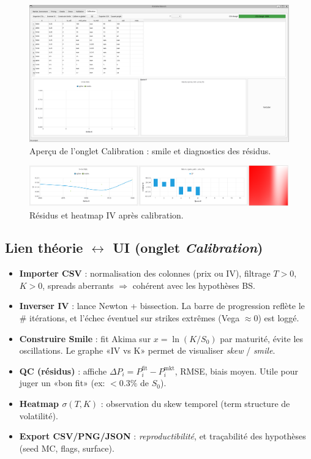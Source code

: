 \documentclass[11pt,a4paper]{article}
\begin{document}
\begin{figure}[h!]
  \centering
    \includegraphics[width=0.9\linewidth]{img/apercu_onglet_calibration.png}
  \caption{Aperçu de l’onglet Calibration : smile et diagnostics des résidus.}
\end{figure}

\begin{figure}[h!]
  \centering
    \includegraphics[width=0.9\linewidth]{img/heatmap_et_residus.png}
  \caption{Résidus et heatmap IV après calibration.}
\end{figure}

\subsection*{Lien théorie $\leftrightarrow$ UI (onglet \emph{Calibration})}
\begin{itemize}[leftmargin=*]
  \item \textbf{Importer CSV} : normalisation des colonnes (prix ou IV), filtrage $T>0$, $K>0$,
        spreads aberrants $\Rightarrow$ cohérent avec les hypothèses BS.
  \item \textbf{Inverser IV} : lance Newton + bissection. La barre de progression reflète le \# itérations,
        et l'échec éventuel sur strikes extrêmes (Vega $\approx 0$) est loggé.
  \item \textbf{Construire Smile} : fit Akima sur $x=\ln(K/S_0)$ par maturité, évite les oscillations.
        Le graphe «IV vs K» permet de visualiser \emph{skew} / \emph{smile}.
  \item \textbf{QC (résidus)} : affiche $\Delta P_i=P^{\text{fit}}_i-P^{\text{mkt}}_i$,
        RMSE, biais moyen. Utile pour juger un «bon fit» (ex: $<0.3\%$ de $S_0$).
  \item \textbf{Heatmap $\sigma(T,K)$} : observation du skew temporel (term structure de volatilité).
  \item \textbf{Export CSV/PNG/JSON} : \emph{reproductibilité}, et traçabilité des hypothèses (seed MC, flags, surface).
\end{itemize}
\end{document}
